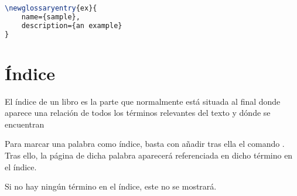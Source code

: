 \begin{lstlisting}[language=TeX]
\newglossaryentry{ex}{
    name={sample},
    description={an example}
}
\end{lstlisting}

\section{Índice}
\label{s:indice}

El índice de un libro es la parte que normalmente está situada al final donde aparece una relación de todos los términos relevantes del texto y dónde se encuentran

Para marcar una palabra como índice, basta con añadir tras ella el comando \texttt{}. Tras ello, la página de dicha palabra aparecerá referenciada en dicho término en el índice.

Si no hay ningún término en el índice, este no se mostrará.

